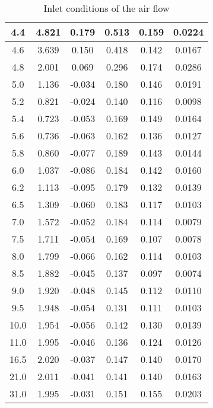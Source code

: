\begin{table}[H]
\begin{center}
\begin{tabular}{|c|c|c|c|c|c|}
     4.4    & 4.821 &  0.179 & 0.513 & 0.159  &  0.0224 \\   \hline
     4.6    & 3.639 &  0.150 & 0.418 & 0.142  &  0.0167 \\   \hline
     4.8    & 2.001 &  0.069 & 0.296 & 0.174  &  0.0286 \\   \hline
     5.0    & 1.136 & -0.034 & 0.180 & 0.146  &  0.0191 \\   \hline
     5.2    & 0.821 & -0.024 & 0.140 & 0.116  &  0.0098 \\   \hline
     5.4    & 0.723 & -0.053 & 0.169 & 0.149  &  0.0164 \\   \hline
     5.6    & 0.736 & -0.063 & 0.162 & 0.136  &  0.0127 \\   \hline
     5.8    & 0.860 & -0.077 & 0.189 & 0.143  &  0.0144 \\   \hline
     6.0    & 1.037 & -0.086 & 0.184 & 0.142  &  0.0160 \\   \hline
     6.2    & 1.113 & -0.095 & 0.179 & 0.132  &  0.0139 \\   \hline
     6.5    & 1.309 & -0.060 & 0.183 & 0.117  &  0.0103 \\   \hline
     7.0    & 1.572 & -0.052 & 0.184 & 0.114  &  0.0079 \\   \hline
     7.5    & 1.711 & -0.054 & 0.169 & 0.107  &  0.0078 \\   \hline
     8.0    & 1.799 & -0.066 & 0.162 & 0.114  &  0.0103 \\   \hline
     8.5    & 1.882 & -0.045 & 0.137 & 0.097  &  0.0074 \\   \hline
     9.0    & 1.920 & -0.048 & 0.145 & 0.112  &  0.0110 \\   \hline
     9.5    & 1.948 & -0.054 & 0.131 & 0.111  &  0.0103 \\   \hline
    10.0    & 1.954 & -0.056 & 0.142 & 0.130  &  0.0139 \\   \hline
    11.0    & 1.995 & -0.046 & 0.136 & 0.124  &  0.0126 \\   \hline
    16.5    & 2.020 & -0.037 & 0.147 & 0.140  &  0.0170 \\   \hline
    21.0    & 2.011 & -0.041 & 0.141 & 0.140  &  0.0163 \\   \hline
    31.0    & 1.995 & -0.031 & 0.151 & 0.155  &  0.0203 \\   \hline
\end{tabular}
\end{center}
\caption{Inlet conditions of the air flow}
\label{CL_fluide}
\end{table}

